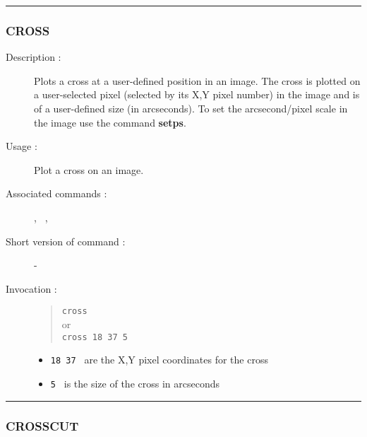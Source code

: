 \hrule
\subsubsection*{\label{CROSS}CROSS}
 
\begin{description}

\item [Description :] Plots a cross at a user-defined position in an
image.  The cross is plotted on a user-selected pixel (selected by its
X,Y pixel number) in the image and is of a user-defined size (in
arcseconds).  To set the arcsecond/pixel scale in the image use the
command {\bf setps}.

\item[Usage :] Plot a cross on an image.

\item[Associated commands :] {\tt {}}, {\tt
{}}, {\tt {}}

\item[Short version of command :] -

\item[Invocation :]

\begin{quote}{\tt  cross }\\
or \\
{\tt cross 18 37 5 }
\end{quote}

\begin{itemize}

\item {\tt 18 37 } are the X,Y pixel coordinates for the cross
\item {\tt 5 } is the size of the cross in arcseconds
\end{itemize}

\end{description}

\hrule 
\subsubsection*{\label{CROSSCUT}CROSSCUT}

